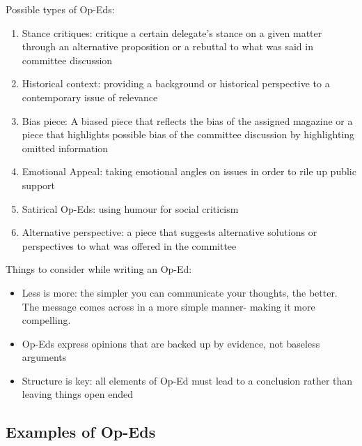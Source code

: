 Possible types of Op-Eds:

\begin{enumerate}
  \item Stance critiques: critique a certain delegate’s stance on a given matter through an alternative proposition or a rebuttal to what was said in committee discussion
  \item Historical context: providing a background or historical perspective to a contemporary issue of relevance
  \item Bias piece: A biased piece that reflects the bias of the assigned magazine or a piece that highlights possible bias of the committee discussion by highlighting omitted information
  \item Emotional Appeal: taking emotional angles on issues in order to rile up public support
  \item Satirical Op-Eds: using humour for social criticism
  \item Alternative perspective: a piece that suggests alternative solutions or perspectives to what was offered in the committee
\end{enumerate}

Things to consider while writing an Op-Ed:

\begin{itemize}
  \item Less is more: the simpler you can communicate your thoughts, the better. The message comes across in a more simple manner- making it more compelling.
  \item Op-Eds express opinions that are backed up by evidence, not baseless arguments
  \item Structure is key: all elements of Op-Ed must lead to a conclusion rather than leaving things open ended
\end{itemize}

\subsection{Examples of Op-Eds}

